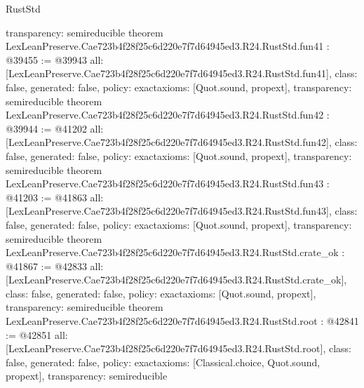 \begin{lexlean}{RustStd}
\begin{coremodule}
{  transparency: semireducible
}
theorem LexLeanPreserve.Cae723b4f28f25c6d220e7f7d64945ed3.R24.RustStd.fun41 : @39455 := @39943 {
  all: [LexLeanPreserve.Cae723b4f28f25c6d220e7f7d64945ed3.R24.RustStd.fun41],
  class: false,
  generated: false,
  policy: exact{axioms: [Quot.sound, propext]},
  transparency: semireducible
}
theorem LexLeanPreserve.Cae723b4f28f25c6d220e7f7d64945ed3.R24.RustStd.fun42 : @39944 := @41202 {
  all: [LexLeanPreserve.Cae723b4f28f25c6d220e7f7d64945ed3.R24.RustStd.fun42],
  class: false,
  generated: false,
  policy: exact{axioms: [Quot.sound, propext]},
  transparency: semireducible
}
theorem LexLeanPreserve.Cae723b4f28f25c6d220e7f7d64945ed3.R24.RustStd.fun43 : @41203 := @41863 {
  all: [LexLeanPreserve.Cae723b4f28f25c6d220e7f7d64945ed3.R24.RustStd.fun43],
  class: false,
  generated: false,
  policy: exact{axioms: [Quot.sound, propext]},
  transparency: semireducible
}
theorem LexLeanPreserve.Cae723b4f28f25c6d220e7f7d64945ed3.R24.RustStd.crate_ok : @41867 := @42833 {
  all: [LexLeanPreserve.Cae723b4f28f25c6d220e7f7d64945ed3.R24.RustStd.crate_ok],
  class: false,
  generated: false,
  policy: exact{axioms: [Quot.sound, propext]},
  transparency: semireducible
}
theorem LexLeanPreserve.Cae723b4f28f25c6d220e7f7d64945ed3.R24.RustStd.root : @42841 := @42851 {
  all: [LexLeanPreserve.Cae723b4f28f25c6d220e7f7d64945ed3.R24.RustStd.root],
  class: false,
  generated: false,
  policy: exact{axioms: [Classical.choice, Quot.sound, propext]},
  transparency: semireducible
}


\end{coremodule}
\end{lexlean}
